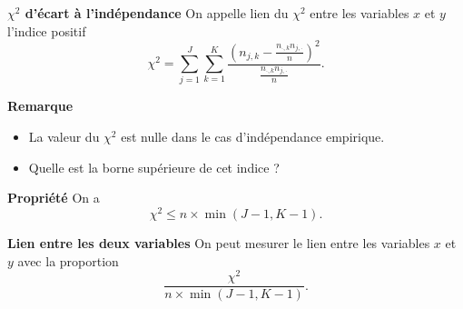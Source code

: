 \documentclass[aspectratio=169,xcolor=dvipsnames]{beamer}
\begin{document}
\begin{frame}
	\begin{block}{\textbf{$\chi^2$ d'écart à l'indépendance}}
	On appelle lien du $\chi^2$ entre les variables $x$ et $y$ l'indice positif
		\[
		\chi^2 = \sum_{j=1}^J \sum_{k=1}^K \dfrac{\left(n_{j,k} - \frac{n_{\cdot,k}n_{j,\cdot}}{n} \right)^2}{\frac{n_{\cdot,k}n_{j,\cdot}}{n}}.
		\]
	\end{block}
	
	\begin{exampleblock}{\textbf{Remarque}}
		\begin{itemize}
		\item La valeur du $\chi^2$ est nulle dans le cas d'indépendance empirique.
		\item Quelle est la borne supérieure de cet indice ?
		\end{itemize}
	\end{exampleblock}
\end{frame}

\begin{frame}
	\begin{alertblock}{\textbf{Propriété}}
	On a 
		\[
		\chi^2 \leqslant n \times \min \left( J-1,K-1 \right).
		\]
	\end{alertblock}
	
	\vfill
	
	\begin{block}{\textbf{Lien entre les deux variables}}
	On peut mesurer le lien entre les variables $x$ et $y$ avec la proportion
	\[\dfrac{\chi^2}{n\times \min (J-1,K-1)}.\]
	\end{block}
\end{frame}
\end{document}
